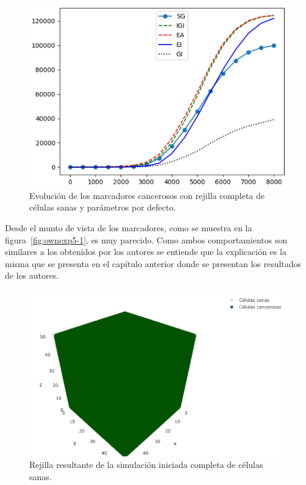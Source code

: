 \begin{figure}[h]
\centering
\includegraphics[scale=0.8]{figures/experiments/exp5/mutations}
\caption{Evolución de los marcadores cancerosos con rejilla completa de células sanas y parámetros por defecto.}
\label{fig:ownexp5-2}
\end{figure}

Desde el munto de vista de los marcadores, como se muestra en la figura~\ref{fig:ownexp5-1}, es muy
parecido. Como ambos comportamientos son similares a los obtenidos por los autores se entiende
que la explicación es la misma que se presenta en el capítulo anterior donde
se presentan los resultados de los autores.

\begin{figure}[h]
\centering
\includegraphics[scale=0.6]{figures/experiments/exp5/grid}
\caption{Rejilla resultante de la simulación iniciada completa de células sanas.}
\label{fig:ownexp5-3}
\end{figure}

